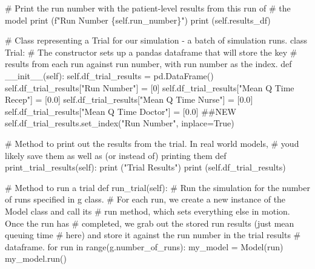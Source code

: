 \documentclass[
  letterpaper,
  DIV=11,
  numbers=noendperiod]{scrreprt}
\newenvironment{Shaded}{}{}
\newcommand{\BuiltInTok}[1]{\textcolor[rgb]{0.84,0.23,0.29}{#1}}
\newcommand{\CommentTok}[1]{\textcolor[rgb]{0.42,0.45,0.49}{#1}}
\newcommand{\ControlFlowTok}[1]{\textcolor[rgb]{0.84,0.23,0.29}{#1}}
\newcommand{\DecValTok}[1]{\textcolor[rgb]{0.00,0.36,0.77}{#1}}
\newcommand{\FloatTok}[1]{\textcolor[rgb]{0.00,0.36,0.77}{#1}}
\newcommand{\FunctionTok}[1]{\textcolor[rgb]{0.44,0.26,0.76}{#1}}
\newcommand{\KeywordTok}[1]{\textcolor[rgb]{0.84,0.23,0.29}{#1}}
\newcommand{\NormalTok}[1]{\textcolor[rgb]{0.14,0.16,0.18}{#1}}
\newcommand{\OperatorTok}[1]{\textcolor[rgb]{0.14,0.16,0.18}{#1}}
\newcommand{\SpecialCharTok}[1]{\textcolor[rgb]{0.00,0.36,0.77}{#1}}
\newcommand{\SpecialStringTok}[1]{\textcolor[rgb]{0.01,0.18,0.38}{#1}}
\newcommand{\StringTok}[1]{\textcolor[rgb]{0.01,0.18,0.38}{#1}}
\newcommand{\VariableTok}[1]{\textcolor[rgb]{0.89,0.38,0.04}{#1}}
\begin{document}
\begin{tcolorbox}
\begin{Shaded}
\begin{Highlighting}[]
        \CommentTok{\# Print the run number with the patient{-}level results from this run of}
        \CommentTok{\# the model}
        \BuiltInTok{print}\NormalTok{ (}\SpecialStringTok{f"Run Number }\SpecialCharTok{\{}\VariableTok{self}\SpecialCharTok{.}\NormalTok{run\_number}\SpecialCharTok{\}}\SpecialStringTok{"}\NormalTok{)}
        \BuiltInTok{print}\NormalTok{ (}\VariableTok{self}\NormalTok{.results\_df)}

\CommentTok{\# Class representing a Trial for our simulation {-} a batch of simulation runs.}
\KeywordTok{class}\NormalTok{ Trial:}
    \CommentTok{\# The constructor sets up a pandas dataframe that will store the key}
    \CommentTok{\# results from each run against run number, with run number as the index.}
    \KeywordTok{def}  \FunctionTok{\_\_init\_\_}\NormalTok{(}\VariableTok{self}\NormalTok{):}
        \VariableTok{self}\NormalTok{.df\_trial\_results }\OperatorTok{=}\NormalTok{ pd.DataFrame()}
        \VariableTok{self}\NormalTok{.df\_trial\_results[}\StringTok{"Run Number"}\NormalTok{] }\OperatorTok{=}\NormalTok{ [}\DecValTok{0}\NormalTok{]}
        \VariableTok{self}\NormalTok{.df\_trial\_results[}\StringTok{"Mean Q Time Recep"}\NormalTok{] }\OperatorTok{=}\NormalTok{ [}\FloatTok{0.0}\NormalTok{]}
        \VariableTok{self}\NormalTok{.df\_trial\_results[}\StringTok{"Mean Q Time Nurse"}\NormalTok{] }\OperatorTok{=}\NormalTok{ [}\FloatTok{0.0}\NormalTok{]}
        \VariableTok{self}\NormalTok{.df\_trial\_results[}\StringTok{"Mean Q Time Doctor"}\NormalTok{] }\OperatorTok{=}\NormalTok{ [}\FloatTok{0.0}\NormalTok{] }\CommentTok{\#\#NEW}
        \VariableTok{self}\NormalTok{.df\_trial\_results.set\_index(}\StringTok{"Run Number"}\NormalTok{, inplace}\OperatorTok{=}\VariableTok{True}\NormalTok{)}

    \CommentTok{\# Method to print out the results from the trial.  In real world models,}
    \CommentTok{\# you\textquotesingle{}d likely save them as well as (or instead of) printing them}
    \KeywordTok{def}\NormalTok{ print\_trial\_results(}\VariableTok{self}\NormalTok{):}
        \BuiltInTok{print}\NormalTok{ (}\StringTok{"Trial Results"}\NormalTok{)}
        \BuiltInTok{print}\NormalTok{ (}\VariableTok{self}\NormalTok{.df\_trial\_results)}

    \CommentTok{\# Method to run a trial}
    \KeywordTok{def}\NormalTok{ run\_trial(}\VariableTok{self}\NormalTok{):}
        \CommentTok{\# Run the simulation for the number of runs specified in g class.}
        \CommentTok{\# For each run, we create a new instance of the Model class and call its}
        \CommentTok{\# run method, which sets everything else in motion.  Once the run has}
        \CommentTok{\# completed, we grab out the stored run results (just mean queuing time}
        \CommentTok{\# here) and store it against the run number in the trial results}
        \CommentTok{\# dataframe.}
        \ControlFlowTok{for}\NormalTok{ run }\KeywordTok{in} \BuiltInTok{range}\NormalTok{(g.number\_of\_runs):}
\NormalTok{            my\_model }\OperatorTok{=}\NormalTok{ Model(run)}
\NormalTok{            my\_model.run()}


\end{Highlighting}
\end{Shaded}
\end{tcolorbox}
\end{document}
